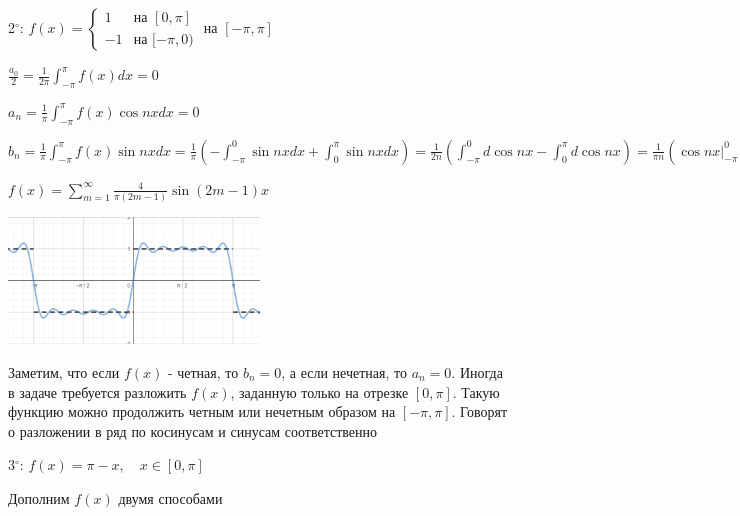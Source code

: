 \documentclass[12pt]{article}
\begin{document}
    2$^\circ$: $f(x) = \begin{cases}1 & \text{на } [0, \pi] \\ -1 & \text{на } [-\pi, 0)\end{cases}$ на $[-\pi, \pi]$

    $\frac{a_0}{2} = \frac{1}{2\pi} \int_{-\pi}^\pi f(x) dx = 0$

    $a_n = \frac{1}{\pi} \int_{-\pi}^\pi f(x) \cos nx dx = 0$

    $b_n = \frac{1}{\pi} \int_{-\pi}^\pi f(x) \sin nx dx = \frac{1}{\pi} \left(-\int_{-\pi}^0 \sin nx dx + \int_0^\pi \sin nx dx\right) = 
    \frac{1}{2n} \left(\int_{-\pi}^0 d\cos nx - \int_0^\pi d\cos nx\right) = \frac{1}{\pi n} \left(\cos nx \Big|_{-\pi}^0 - \cos nx \Big|_0^\pi\right) = 
    \frac{1}{\pi n} (1 - \cos \pi n - \cos \pi n + 1) = \frac{2}{\pi n}(1 - \cos \pi n) = \frac{4}{\pi (2m - 1)}$

    $f(x) = \sum_{m = 1}^\infty \frac{4}{\pi (2m - 1)} \sin (2m - 1) x$

    \begin{center}
        \includegraphics[width=0.5\textwidth]{addchapters1/images/addchapters1_2024_11_15_2}
    \end{center}

    \Nota Заметим, что если $f(x)$ - четная, то $b_n = 0$, а если нечетная, то $a_n = 0$. Иногда в задаче
    требуется разложить $f(x)$, заданную только на отрезке $[0, \pi]$. Такую функцию можно продолжить четным
    или нечетным образом на $[-\pi, \pi]$. Говорят о разложении в ряд по косинусам и синусам соответственно

    3$^\circ$: $f(x) = \pi - x, \quad x \in [0, \pi]$

    Дополним $f(x)$ двумя способами
\end{document}
